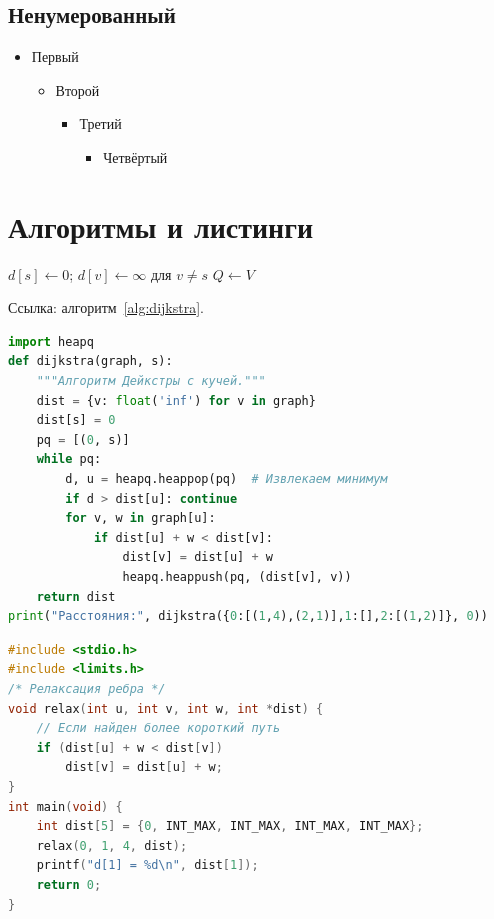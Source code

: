 \documentclass[font=modern]{cmcmsuthesis-master}
\begin{document}
\subsection{Ненумерованный}
\begin{itemize}\item Первый\begin{itemize}\item Второй\begin{itemize}\item Третий\begin{itemize}\item Четвёртый\end{itemize}\end{itemize}\end{itemize}\end{itemize}

\section{Алгоритмы и листинги}

\begin{algorithm}[H]\caption{Алгоритм Дейкстры}\label{alg:dijkstra}
$d[s]\gets 0$; $d[v]\gets\infty$ для $v\neq s$\;
$Q\gets V$
\;
\end{algorithm}
Ссылка: алгоритм~\ref{alg:dijkstra}.

\begin{lstlisting}[language=Python,caption={Python},label={lst:py}]
import heapq
def dijkstra(graph, s):
    """Алгоритм Дейкстры с кучей."""
    dist = {v: float('inf') for v in graph}
    dist[s] = 0
    pq = [(0, s)]
    while pq:
        d, u = heapq.heappop(pq)  # Извлекаем минимум
        if d > dist[u]: continue
        for v, w in graph[u]:
            if dist[u] + w < dist[v]:
                dist[v] = dist[u] + w
                heapq.heappush(pq, (dist[v], v))
    return dist
print("Расстояния:", dijkstra({0:[(1,4),(2,1)],1:[],2:[(1,2)]}, 0))
\end{lstlisting}

\begin{lstlisting}[language=C,caption={C},label={lst:c}]
#include <stdio.h>
#include <limits.h>
/* Релаксация ребра */
void relax(int u, int v, int w, int *dist) {
    // Если найден более короткий путь
    if (dist[u] + w < dist[v])
        dist[v] = dist[u] + w;
}
int main(void) {
    int dist[5] = {0, INT_MAX, INT_MAX, INT_MAX, INT_MAX};
    relax(0, 1, 4, dist);
    printf("d[1] = %d\n", dist[1]);
    return 0;
}
\end{lstlisting}
\end{document}
